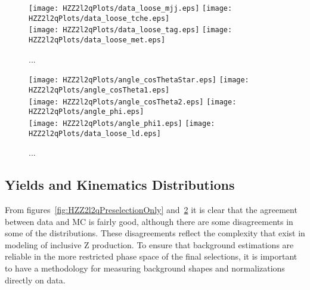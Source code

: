 \begin{figure}
\begin{center}
\texttt{[image: HZZ2l2qPlots/data\_loose\_mjj.eps]}
\texttt{[image: HZZ2l2qPlots/data\_loose\_tche.eps]}\\
\texttt{[image: HZZ2l2qPlots/data\_loose\_tag.eps]}
\texttt{[image: HZZ2l2qPlots/data\_loose\_met.eps]}
\label{fig:HZZ2l2qPreselectiOnly}
\caption{ ... }
\end{center}
\end{figure}

\begin{figure}
\begin{center}
\texttt{[image: HZZ2l2qPlots/angle\_cosThetaStar.eps]}
\texttt{[image: HZZ2l2qPlots/angle\_cosTheta1.eps]}\\
\texttt{[image: HZZ2l2qPlots/angle\_cosTheta2.eps]}
\texttt{[image: HZZ2l2qPlots/angle\_phi.eps]}\\
\texttt{[image: HZZ2l2qPlots/angle\_phi1.eps]}
\texttt{[image: HZZ2l2qPlots/data\_loose\_ld.eps]}
\label{fig:HZZ2l2qAngularLD}
\caption{ ... }
\end{center}
\end{figure}

\subsection{Yields and Kinematics Distributions}
\label{sec:HZZ2l2qyields}

From figures~\ref{fig:HZZ2l2qPreselectionOnly} and~\ref{fig:HZZ2l2qAngularLD}
it is clear that the agreement between data and MC is fairly good,  
although there are some disagreements in some of the distributions.
These disagreements reflect the complexity that exist in modeling of
inclusive Z production.  To ensure that background estimations are
reliable in the more restricted phase space of the final selections,
it is important to have a methodology for measuring background 
shapes and normalizations directly on data.  

